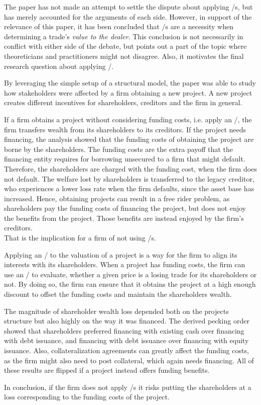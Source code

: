 \documentclass[main.tex]{subfiles}
\begin{document}
    The paper has not made an attempt to settle the dispute about applying \FVA/s,
    but has merely accounted for the arguments of each side.
    However, in support of the relevance of this paper,
    it has been concluded that \FVA/s are a necessity 
    when determining a trade's \textit{value to the dealer}.
    This conclusion is not necessarily in conflict with either side of the debate,
    but points out a part of the topic where theoreticians and practitioners might not disagree.
    Also, it motivates the final research question about applying \FVA/.

    \textbf{\researchQuestionFvaImplications}
    By leveraging the simple setup of a structural model,
    the paper was able to study how stakeholders were affected by a firm obtaining a new project.
    A new project creates different incentives for shareholders, creditors and the firm in general.

    If a firm obtains a project without considering funding costs, i.e. apply an \FVA/,
    the firm transfers wealth from its shareholders to its creditors.
    If the project needs financing, 
    the analysis showed that the funding costs 
    of obtaining the project are borne by the shareholders.
    The funding costs are the extra payoff that the financing entity requires
    for borrowing unsecured to a firm that might default.
    Therefore, the shareholders are charged with the funding cost, when the firm does not default.
    The welfare lost by shareholders is transferred to the legacy creditor,
    who experiences a lower loss rate when the firm defaults, since the asset base has increased.
    Hence, obtaining projects can result in a free rider problem, 
    as shareholders pay the funding costs of financing the project,
    but does not enjoy the benefits from the project.
    Those benefits are instead enjoyed by the firm's creditors. \\
    That is the implication for a firm of not using \FVA/s.

    Applying an \FVA/ to the valuation of a project is a way for the firm 
    to align its interests with its shareholders.
    When a project has funding costs,
    the firm can use an \FVA/ to evaluate,
    whether a given price is a losing trade for its shareholders or not.
    By doing so, the firm can ensure that it obtains the project at a high enough discount
    to offset the funding costs and maintain the shareholders wealth.

    The magnitude of shareholder wealth loss depended both on the projects structure
    but also highly on the way it was financed. 
    The derived pecking order showed that shareholders preferred 
    financing with existing cash over financing with debt issuance, 
    and financing with debt issuance over financing with equity issuance.
    Also, collateralization agreements can greatly affect the funding costs,
    as the firm might also need to post collateral, which again needs financing.
    All of these results are flipped if a project instead offers funding benefits.

    In conclusion, if the firm does not apply \FVA/s it risks putting the shareholders at a loss
    corresponding to the funding costs of the project.
\end{document}
